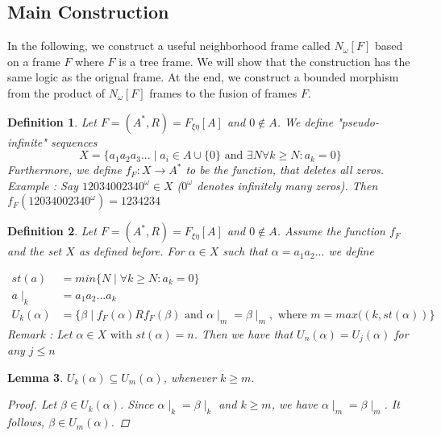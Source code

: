 \documentclass[12pt, a4paper]{scrartcl}
\newtheorem{definition}{Definition}[subsection]
\newtheorem{lemma}[definition]{Lemma}
\begin{document}
\subsection{Main Construction}
In the following, we construct a useful neighborhood frame called $N_\omega[F]$ based on a frame $F$ where $F$ is a tree frame.
We will show that the construction has the same logic as the orignal frame. 
At the end, we construct a bounded morphism from the product of $N_\omega[F]$ frames to the fusion of frames $F$.


\begin{definition}
    Let $F = (A^*, R) = F_{\xi \eta}[A]$ and $0 \notin A$. We define "pseudo-infinite" sequences 
    $$X = \{a_1a_2a_3... \mid a_i \in A \cup \{0\} \mbox{ and } \exists N \forall k \geq N : a_k = 0\}$$
    Furthermore, we define $f_F : X \rightarrow A^*$ to be the function, that deletes all zeros. \newline \newline
    Example : Say $12034002340^\omega \in X$ ($0^\omega$ denotes infinitely many zeros). Then $f_F(12034002340^\omega) = 1234234$

\end{definition}

\begin{definition}
    Let $F = (A^*, R) = F_{\xi \eta}[A]$ and $0 \notin A$. Assume the function $f_F$ and the set $X$ as defined before.
    For $\alpha \in X$ such that $\alpha = a_1a_2...$ we define 
    
    \begin{align*}
            st(a) &= min\{N \mid \forall k \geq N : a_k = 0\} \\
            a \mid_{k} &= a_1a_2...a_k \\
            U_k(\alpha) &= \{ \beta \mid f_F(\alpha)Rf_F(\beta) \mbox{ and } \alpha \mid_m = \beta \mid_m,  \mbox{ where } m = max((k, st(\alpha))\} 
    \end{align*} 
    Remark : Let $\alpha \in X \mbox{ with } st(\alpha) = n$. Then we have that $U_n(\alpha) = U_j(\alpha)$ for any $j \leq n$

\end{definition}

\begin{lemma}
    $U_k(\alpha) \subseteq U_m(\alpha)$, whenever $k \geq m$.
    
    \begin{proof}
        Let $\beta \in U_k(\alpha)$. Since $\alpha \mid_k = \beta \mid_k$ and $k \geq m$, we have $\alpha \mid_m = \beta \mid_m$. It follows, $\beta \in U_m(\alpha)$.
    \end{proof}
\end{lemma}
\end{document}
